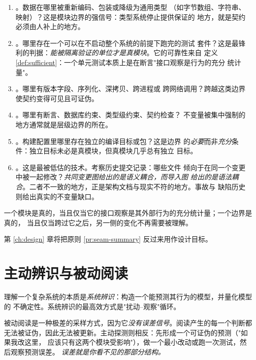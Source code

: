 \begin{enumerate}[label=(S\arabic*)]
\item {}。数据在哪里被重新编码、包装或降级为通用类型
      （如字节数组、字符串、映射）？这是模块边界的强信号：类型系统停止提供保证的
      地方，就是契约必须由人补上的地方。
\item {}。哪里存在一个可以在不启动整个系统的前提下跑完的测试
      套件？这是最锋利的判据：\emph{能被隔离验证的单位才是真模块}。它的可靠性来自
      定义 \ref{def:sufficient}：一个单元测试本质上是在断言"接口观察是行为的充分
      统计量"。
\item {}。哪里有版本字段、序列化、深拷贝、跨进程或
      跨网络调用？跨越这类边界使契约变得可见且可证伪。
\item {}。哪里有断言、数据库约束、类型级约束、契约检查？
      不变量被集中强制的地方通常就是层级边界的所在。
\item {}。构建配置里哪里存在独立的编译目标或包？这是边界
      的\emph{必要}而非\emph{充分}条件：独立目标未必是真模块，但真模块几乎总有独立
      目标。
\item {}。这是最被低估的技术。考察历史提交记录：哪些文件
      倾向于在同一个变更中被一起修改？\emph{共同变更图给出的是语义耦合，而导入图
      给出的是语法耦合}。二者不一致的地方，正是架构文档与现实不符的地方。事故与
      缺陷历史则给出真实的不变量缺口。
\end{enumerate}

\begin{principle}[缝的判据总结]\label{pr:seam-summary}
一个模块是真的，当且仅当它的接口观察是其外部行为的充分统计量；一个边界是真的，
当且仅当跨过它之后，另一侧的变化不再需要被理解。
\end{principle}

第 \ref{ch:design} 章将把原则 \ref{pr:seam-summary} 反过来用作设计目标。

\section{主动辨识与被动阅读}\label{sec:active}

\begin{principle}[理解即系统辨识]\label{pr:sysid}
理解一个复杂系统的本质是\emph{系统辨识}：构造一个能预测其行为的模型，并量化模型的
不确定性。系统辨识的最高效方式是"扰动--观察"循环。
\end{principle}

被动阅读是一种极差的采样方式，因为它\emph{没有误差信号}。阅读产生的每一个判断都
无法被证伪，因此无法被更新。主动探测则相反：先形成一个可证伪的预测（"如果我改这里，
应该只有这两个模块受影响"），做一个最小改动或跑一次测试，然后观察预测误差。
\emph{误差就是你看不见的那部分结构。}

